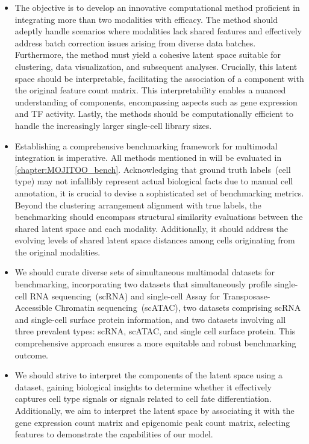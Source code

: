 \begin{itemize}
	\item
	The objective is to develop an innovative computational method proficient in integrating more than two modalities with efficacy. The method should adeptly handle scenarios where modalities lack shared features and effectively address batch correction issues arising from diverse data batches. Furthermore, the method must yield a cohesive latent space suitable for clustering, data visualization, and subsequent analyses. Crucially, this latent space should be interpretable, facilitating the association of a component with the original feature count matrix. This interpretability enables a nuanced understanding of components, encompassing aspects such as gene expression and TF activity. Lastly, the methods should be computationally efficient to handle the increasingly larger single-cell library sizes.
	\item
	Establishing a comprehensive benchmarking framework for multimodal integration is imperative. All methods mentioned in  will be evaluated in \cref{chapter:MOJITOO_bench}. Acknowledging that ground truth labels~(cell type) may not infallibly represent actual biological facts due to manual cell annotation, it is crucial to devise a sophisticated set of benchmarking metrics. Beyond the clustering arrangement alignment with true labels, the benchmarking should encompass structural similarity evaluations between the shared latent space and each modality. Additionally, it should address the evolving levels of shared latent space distances among cells originating from the original modalities.

	\item
	We should curate diverse sets of simultaneous multimodal datasets for benchmarking, incorporating two datasets that simultaneously profile single-cell RNA sequencing~(scRNA) and single-cell Assay for Transposase-Accessible Chromatin sequencing~(scATAC), two datasets comprising scRNA and single-cell surface protein information, and two datasets involving all three prevalent types: scRNA, scATAC, and single cell surface protein. This comprehensive approach ensures a more equitable and robust benchmarking outcome.

	\item
	We should strive to interpret the components of the latent space using a dataset, gaining biological insights to determine whether it effectively captures cell type signals or signals related to cell fate differentiation. Additionally, we aim to interpret the latent space by associating it with the gene expression count matrix and epigenomic peak count matrix, selecting features to demonstrate the capabilities of our model.
\end{itemize}
\FloatBarrier %


